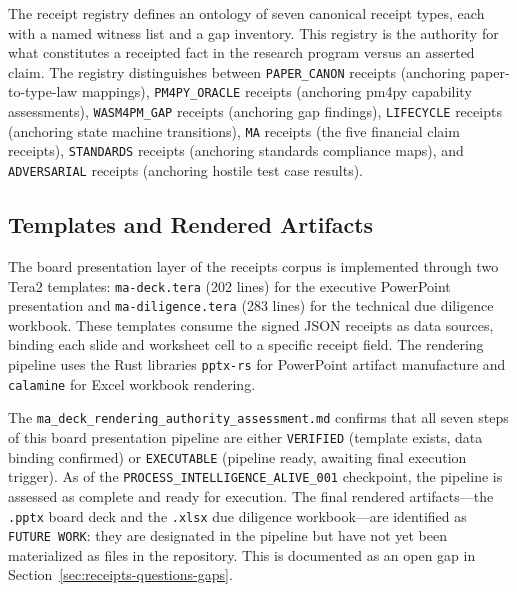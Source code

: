 The receipt registry defines an ontology of seven canonical receipt types, each with
a named witness list and a gap inventory. This registry is the authority for what
constitutes a receipted fact in the research program versus an asserted claim. The
registry distinguishes between \texttt{PAPER\_CANON} receipts (anchoring paper-to-type-law
mappings), \texttt{PM4PY\_ORACLE} receipts (anchoring pm4py capability assessments),
\texttt{WASM4PM\_GAP} receipts (anchoring gap findings), \texttt{LIFECYCLE} receipts
(anchoring state machine transitions), \texttt{MA} receipts (the five financial claim
receipts), \texttt{STANDARDS} receipts (anchoring standards compliance maps), and
\texttt{ADVERSARIAL} receipts (anchoring hostile test case results).

\subsection{Templates and Rendered Artifacts}
\label{sec:receipts-implementation-templates}

The board presentation layer of the receipts corpus is implemented through two Tera2
templates: \texttt{ma-deck.tera} (202 lines) for the executive PowerPoint presentation
and \texttt{ma-diligence.tera} (283 lines) for the technical due diligence workbook.
These templates consume the signed JSON receipts as data sources, binding each slide
and worksheet cell to a specific receipt field. The rendering pipeline uses the Rust
libraries \texttt{pptx-rs} for PowerPoint artifact manufacture and \texttt{calamine}
for Excel workbook rendering.

The \texttt{ma\_deck\_rendering\_authority\_assessment.md} confirms that all seven
steps of this board presentation pipeline are either \texttt{VERIFIED} (template exists,
data binding confirmed) or \texttt{EXECUTABLE} (pipeline ready, awaiting final execution
trigger). As of the \texttt{PROCESS\_INTELLIGENCE\_ALIVE\_001} checkpoint, the pipeline
is assessed as complete and ready for execution. The final rendered artifacts---the
\texttt{.pptx} board deck and the \texttt{.xlsx} due diligence workbook---are identified
as \texttt{FUTURE WORK}: they are designated in the pipeline but have not yet been
materialized as files in the repository. This is documented as an open gap in
Section~\ref{sec:receipts-questions-gaps}.
